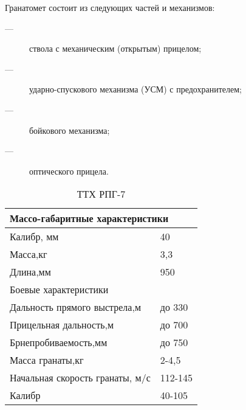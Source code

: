 \documentclass[12pt,a4paper]{report}
\begin{document}
Гранатомет состоит из следующих частей и механизмов:
\begin{description}
	\item[---]ствола с механическим (открытым) прицелом;
	\item[---]ударно-спускового механизма (УСМ) с предохранителем;
	\item[---]бойкового механизма;
	\item[---]оптического прицела.
\end{description}
\begin{table}[h!]
	\centering
	\caption{ТТХ РПГ-7}
	\label{tab:RPG-7}
	\begin{tabular}{|l|l|}
		\hline
		\multicolumn{2}{|l|}{Массо-габаритные характеристики} \\ \hline
		Калибр, мм                            & 40            \\ \hline
		Масса,кг                              & 3,3           \\ \hline
		Длина,мм                              & 950           \\ \hline
		\multicolumn{2}{|l|}{Боевые характеристики}           \\ \hline
		Дальность прямого выстрела,м          & до 330        \\ \hline
		Прицельная дальность,м                & до 700        \\ \hline
		Брнепробиваемость,мм                  & до 750        \\ \hline
		Масса гранаты,кг                      & 2-4,5         \\ \hline
		Начальная скорость гранаты, м/с       & 112-145       \\ \hline
		Калибр                                & 40-105        \\ \hline
	\end{tabular}
\end{table}
\end{document}

